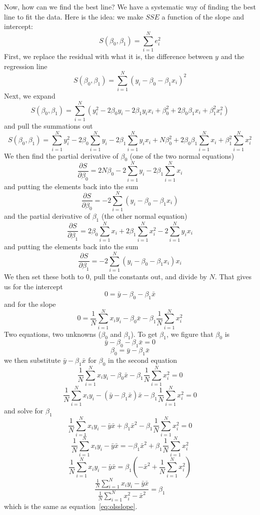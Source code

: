 Now, how can we find the best line? We have a systematic way of finding the best line to fit the data. Here is the idea: we make $SSE$ a function of the slope and intercept:
\[
S\left(\beta_0,\beta_1\right)=\sum_{i=1}^Ne_i^2
\]
First, we replace the residual with what it is, the difference between $y$ and the regression line
\[
S\left(\beta_0,\beta_1\right)=\sum_{i=1}^N\left(y_i-\beta_0-\beta_1x_i\right)^2
\]
Next, we expand
\[
S\left(\beta_0,\beta_1\right)=\sum_{i=1}^N\left(y_i^2-2\beta_0y_i-2\beta_1y_ix_i+\beta_0^2+2\beta_0\beta_1x_i+\beta_1^2x_i^2\right)
\]
and pull the summations out
\[
S\left(\beta_0,\beta_1\right)=\sum_{i=1}^Ny_i^2-2\beta_0\sum_{i=1}^Ny_i-2\beta_1\sum_{i=1}^Ny_ix_i+N\beta_0^2+2\beta_0\beta_1\sum_{i=1}^Nx_i+\beta_1^2\sum_{i=1}^Nx_i^2
\]
We then find the partial derivative of $\beta_0$ (one of the two normal equations)
\[
\frac{\partial S}{\partial \beta_0}=2N\beta_0-2\sum_{i=1}^Ny_i-2\beta_1\sum_{i=1}^Nx_i
\]
and putting the elements back into the sum
\begin{equation}
\frac{\partial S}{\partial \beta_0}=-2\sum_{i=1}^N\left(y_i-\beta_0-\beta_1x_i\right)
\end{equation}
and the partial derivative of $\beta_1$ (the other normal equation)
\[
\frac{\partial S}{\partial \beta_1}=2\beta_0\sum_{i=1}^Nx_i+2\beta_1\sum_{i=1}^Nx_i^2-2\sum_{i=1}^Ny_ix_i
\]
and putting the elements back into the sum
\begin{equation}
\frac{\partial S}{\partial \beta_1}=-2\sum_{i=1}^N\left(y_i-\beta_0-\beta_1x_i\right)x_i
\end{equation}
We then set these both to 0, pull the constants out, and divide by $N$. That gives us for the intercept
\[
0=\bar{y}-\beta_0-\beta_1\bar{x}
\]
and for the slope
\[
0=\frac{1}{N}\sum_{i=1}^Nx_iy_i-\beta_0\bar{x}-\beta_1\frac{1}{N}\sum_{i=1}^Nx_i^2
\]
Two equations, two unknowns ($\beta_0$ and $\beta_1$). To get $\beta_1$, we figure that $\beta_0$ is
\[
\bar{y}-\beta_0-\beta_1\bar{x}=0
\]
\[
\beta_0=\bar{y}-\beta_1\bar{x}
\]
we then substitute $\bar{y}-\beta_1\bar{x}$ for $\beta_0$ in the second equation
\[
\frac{1}{N}\sum_{i=1}^Nx_iy_i-\beta_0\bar{x}-\beta_1\frac{1}{N}\sum_{i=1}^Nx_i^2 = 0
\]
\[
\frac{1}{N}\sum_{i=1}^Nx_iy_i-\left(\bar{y}-\beta_1\bar{x}\right)\bar{x}-\beta_1\frac{1}{N}\sum_{i=1}^Nx_i^2 = 0
\]
and solve for $\beta_1$
\[
\frac{1}{N}\sum_{i=1}^Nx_iy_i-\bar{y}\bar{x}+\beta_1\bar{x}^2-\beta_1\frac{1}{N}\sum_{i=1}^Nx_i^2 = 0
\]
\[
\frac{1}{N}\sum_{i=1}^Nx_iy_i-\bar{y}\bar{x} = -\beta_1\bar{x}^2+\beta_1\frac{1}{N}\sum_{i=1}^Nx_i^2
\]
\[
\frac{1}{N}\sum_{i=1}^Nx_iy_i-\bar{y}\bar{x} = \beta_1\left(-\bar{x}^2+\frac{1}{N}\sum_{i=1}^Nx_i^2\right)
\]
\[
\frac{\frac{1}{N}\sum_{i=1}^Nx_iy_i-\bar{y}\bar{x}}{\frac{1}{N}\sum_{i=1}^Nx_i^2-\bar{x}^2} = \beta_1
\]
which is the same as equation~\eqref{eq:olsslope}.


